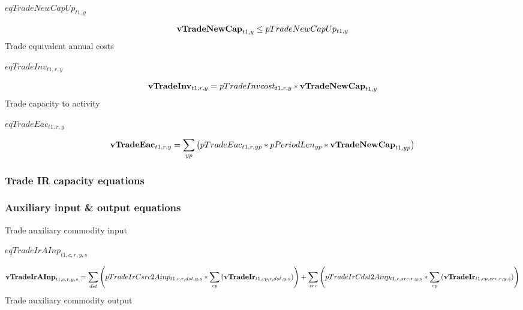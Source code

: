 \documentclass{article}
\begin{document}
$eqTradeNewCapUp_{t1,y}$





\begin{dmath} 
{\bf vTradeNewCap}_{t1,y}  \le  pTradeNewCapUp_{t1,y}
\end{dmath} 
Trade equivalent annual costs







$eqTradeInv_{t1,r,y}$





\begin{dmath} 
{\bf vTradeInv}_{t1,r,y}  =  pTradeInvcost_{t1,r,y}*{\bf vTradeNewCap}_{t1,y}
\end{dmath} 
Trade capacity to activity







$eqTradeEac_{t1,r,y}$





\begin{dmath} 
{\bf vTradeEac}_{t1,r,y}  =  \sum_{yp}{\left(pTradeEac_{t1,r,yp}*pPeriodLen_{yp}*{\bf vTradeNewCap}_{t1,yp}\right)}
\end{dmath} 
\subsubsection*{Trade IR capacity equations}
\subsubsection*{Auxiliary input \& output equations}
Trade auxiliary commodity input







$eqTradeIrAInp_{t1,c,r,y,s}$





\begin{dmath} 
{\bf vTradeIrAInp}_{t1,c,r,y,s}  =  \sum_{dst}{\left(pTradeIrCsrc2Ainp_{t1,c,r,dst,y,s}*\sum_{cp}{\left({\bf vTradeIr}_{t1,cp,r,dst,y,s}\right)}\right)}+\sum_{src}{\left(pTradeIrCdst2Ainp_{t1,c,src,r,y,s}*\sum_{cp}{\left({\bf vTradeIr}_{t1,cp,src,r,y,s}\right)}\right)}
\end{dmath} 
Trade auxiliary commodity output
\end{document}
